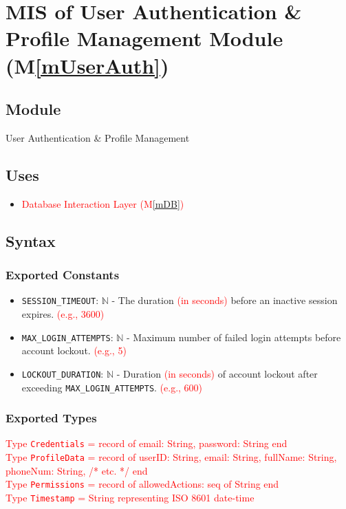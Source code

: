 \documentclass[12pt, titlepage]{article}
\providecommand{\mref}[1]{M\ref{#1}}
\begin{document}
\section{MIS of User Authentication \& Profile Management Module (\mref{mUserAuth})}

\subsection{Module}
User Authentication \& Profile Management

\subsection{Uses}
\begin{itemize}
    \item \textcolor{red}{Database Interaction Layer (\mref{mDB})}
\end{itemize}

\subsection{Syntax}
\subsubsection{Exported Constants}
\begin{itemize}
    \item \texttt{SESSION\_TIMEOUT}: $\mathbb{N}$ - The duration \textcolor{red}{(in seconds)} before an inactive session expires. \textcolor{red}{(e.g., 3600)}
    \item \texttt{MAX\_LOGIN\_ATTEMPTS}: $\mathbb{N}$ - Maximum number of failed login attempts before account lockout. \textcolor{red}{(e.g., 5)}
    \item \texttt{LOCKOUT\_DURATION}: $\mathbb{N}$ - Duration \textcolor{red}{(in seconds)} of account lockout after exceeding \texttt{MAX\_LOGIN\_ATTEMPTS}. \textcolor{red}{(e.g., 600)}
\end{itemize}

\subsubsection{Exported Types} %
\textcolor{red}{Type \texttt{Credentials} = record of email: String, password: String end} \\
\textcolor{red}{Type \texttt{ProfileData} = record of userID: String, email: String, fullName: String, phoneNum: String, /* etc. */ end} \\
\textcolor{red}{Type \texttt{Permissions} = record of allowedActions: seq of String end} \\
\textcolor{red}{Type \texttt{Timestamp} = String representing ISO 8601 date-time}
\end{document}
